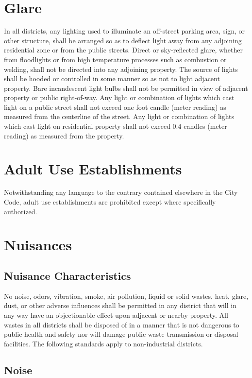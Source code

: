 \section{Glare}
In all districts, any lighting used to illuminate an off-street parking area, sign, or other structure, shall be arranged so as to deflect light away from any adjoining residential zone or from the public streets. Direct or sky-reflected glare, whether from floodlights or from high temperature processes such as combustion or welding, shall not be directed into any adjoining property. The source of lights shall be hooded or controlled in some manner so as not to light adjacent property. Bare incandescent light bulbs shall not be permitted in view of adjacent property or public right-of-way.  Any light or combination of lights which cast light on a public street shall not exceed one foot candle (meter reading) as measured from the centerline of the street. Any light or combination of lights which cast light on residential property shall not exceed 0.4 candles (meter reading) as measured from the property.

\section{Adult Use Establishments}
Notwithstanding any language to the contrary contained elsewhere in the City Code, adult use establishments are prohibited except where specifically authorized.

\section{Nuisances}
\subsection{Nuisance Characteristics}
No noise, odors, vibration, smoke, air pollution, liquid or solid wastes, heat, glare, dust, or other adverse influences shall be permitted in any district that will in any way have an objectionable effect upon adjacent or nearby property. All wastes in all districts shall be disposed of in a manner that is not dangerous to public health and safety nor will damage public waste transmission or disposal facilities. The following standards apply to non-industrial districts.
\subsection{Noise}
